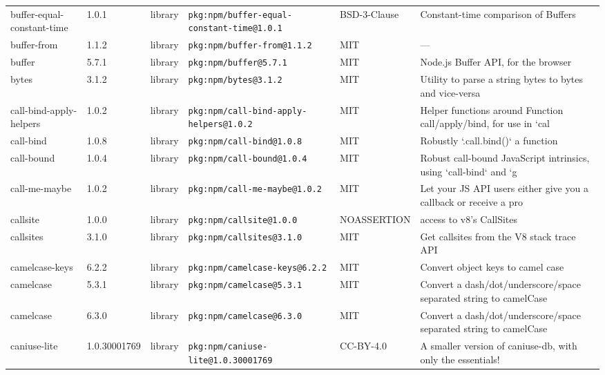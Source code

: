 \documentclass[11pt,a4paper]{article}
\begin{document}
\begin{longtable}{|p{4cm}|p{2cm}|p{1.6cm}|p{5cm}|p{1.5cm}|p{3.5cm}|}
\raggedright buffer-equal-constant-time & 1.0.1 & library & \small\texttt{pkg:npm/buffer-equal-constant-time@1.0.1} & BSD-3-Clause & \small Constant-time comparison of Buffers \\
\raggedright buffer-from & 1.1.2 & library & \small\texttt{pkg:npm/buffer-from@1.1.2} & MIT & \small — \\
\raggedright buffer & 5.7.1 & library & \small\texttt{pkg:npm/buffer@5.7.1} & MIT & \small Node.js Buffer API, for the browser \\
\raggedright bytes & 3.1.2 & library & \small\texttt{pkg:npm/bytes@3.1.2} & MIT & \small Utility to parse a string bytes to bytes and vice-versa \\
\raggedright call-bind-apply-helpers & 1.0.2 & library & \small\texttt{pkg:npm/call-bind-apply-helpers@1.0.2} & MIT & \small Helper functions around Function call/apply/bind, for use in `cal \\
\raggedright call-bind & 1.0.8 & library & \small\texttt{pkg:npm/call-bind@1.0.8} & MIT & \small Robustly `.call.bind()` a function \\
\raggedright call-bound & 1.0.4 & library & \small\texttt{pkg:npm/call-bound@1.0.4} & MIT & \small Robust call-bound JavaScript intrinsics, using `call-bind` and `g \\
\raggedright call-me-maybe & 1.0.2 & library & \small\texttt{pkg:npm/call-me-maybe@1.0.2} & MIT & \small Let your JS API users either give you a callback or receive a pro \\
\raggedright callsite & 1.0.0 & library & \small\texttt{pkg:npm/callsite@1.0.0} & NOASSERTION & \small access to v8's CallSites \\
\raggedright callsites & 3.1.0 & library & \small\texttt{pkg:npm/callsites@3.1.0} & MIT & \small Get callsites from the V8 stack trace API \\
\raggedright camelcase-keys & 6.2.2 & library & \small\texttt{pkg:npm/camelcase-keys@6.2.2} & MIT & \small Convert object keys to camel case \\
\raggedright camelcase & 5.3.1 & library & \small\texttt{pkg:npm/camelcase@5.3.1} & MIT & \small Convert a dash/dot/underscore/space separated string to camelCase \\
\raggedright camelcase & 6.3.0 & library & \small\texttt{pkg:npm/camelcase@6.3.0} & MIT & \small Convert a dash/dot/underscore/space separated string to camelCase \\
\raggedright caniuse-lite & 1.0.30001769 & library & \small\texttt{pkg:npm/caniuse-lite@1.0.30001769} & CC-BY-4.0 & \small A smaller version of caniuse-db, with only the essentials! \\

\end{longtable}
\end{document}
